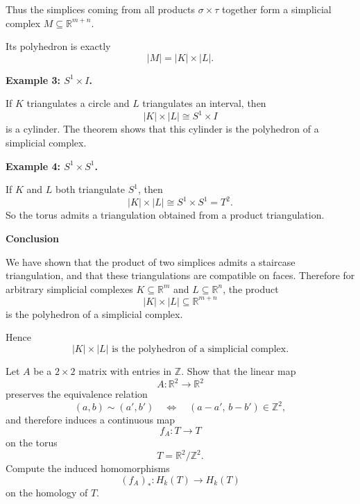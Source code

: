 \begin{solution}
Thus the simplices coming from all products \(\sigma\times\tau\) together form a simplicial complex \(M\subseteq \mathbb R^{m+n}\).

Its polyhedron is exactly
\[
|M|=|K|\times |L|.
\]

\par

\textbf{Example 3: \(S^1\times I\).}

If \(K\) triangulates a circle and \(L\) triangulates an interval, then
\[
|K|\times |L| \cong S^1\times I
\]
is a cylinder. The theorem shows that this cylinder is the polyhedron of a simplicial complex.

\par

\textbf{Example 4: \(S^1\times S^1\).}

If \(K\) and \(L\) both triangulate \(S^1\), then
\[
|K|\times |L| \cong S^1\times S^1=T^2.
\]
So the torus admits a triangulation obtained from a product triangulation.


\medskip
\noindent\textbf{Conclusion}\par
\smallskip


We have shown that the product of two simplices admits a staircase triangulation, and that these triangulations are compatible on faces. Therefore for arbitrary simplicial complexes \(K\subseteq \mathbb R^m\) and \(L\subseteq \mathbb R^n\), the product
\[
|K|\times |L| \subseteq \mathbb R^{m+n}
\]
is the polyhedron of a simplicial complex.

Hence
\[
\boxed{|K|\times |L|\text{ is the polyhedron of a simplicial complex.}}
\]
\end{solution}

\begin{problem}
Let \(A\) be a \(2\times 2\) matrix with entries in \(\mathbb Z\). Show that the linear map
\[
A:\mathbb R^2\to \mathbb R^2
\]
preserves the equivalence relation
\[
(a,b)\sim (a',b')
\quad\Longleftrightarrow\quad
(a-a',\,b-b')\in \mathbb Z^2,
\]
and therefore induces a continuous map
\[
f_A:T\to T
\]
on the torus
\[
T=\mathbb R^2/\mathbb Z^2.
\]
Compute the induced homomorphisms
\[
(f_A)_*:H_k(T)\to H_k(T)
\]
on the homology of \(T\).

\par
\end{problem}

